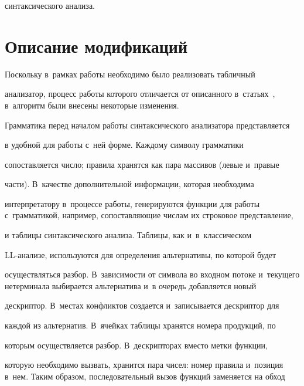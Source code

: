 синтаксического анализа.





\vspace*{-6pt}





\section{Описание модификаций}





\vspace*{-2pt}





Поскольку в~рамках работы необходимо было реализовать табличный


анализатор, процесс работы которого отличается от описанного в~статьях~\cite{8-gri, 15-gri}, в~алгоритм были внесены некоторые изменения.





Грамматика перед началом работы синтаксического анализатора пред\-став\-ля\-ет\-ся


в удобной для работы с~ней форме. Каждому символу грамматики


сопоставляется число; правила хранятся как пара массивов (левые и~правые


части). В~качестве дополнительной информации, которая необходима


интерпретатору в~процессе работы, генерируются функции для работы с~грамматикой, например, сопоставляющие числам их строковое представление,


и таблицы синтаксического анализа. Таблицы, как и~в~классическом


LL-ана\-ли\-зе, используются для определения альтернативы, по которой будет


осуществляться разбор. В~зависимости от символа во входном потоке и~текущего нетерминала выбирается альтернатива и~в очередь добавляется новый


дескриптор. В~местах конфликтов создается и~записывается дескриптор для


каждой из альтернатив. В~ячейках таб\-ли\-цы хранятся номера продукций, по


которым осуществляется разбор. В~дескрипторах вместо метки функции,


которую необходимо вызвать, хранится пара чисел: номер правила и~позиция в~нем. Таким образом, последовательный вызов функций заменяется на обход


